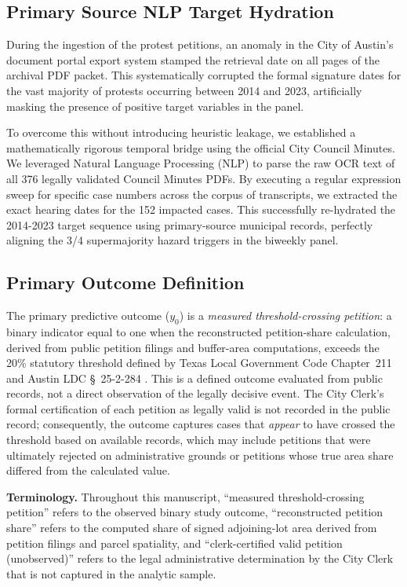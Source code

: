 \documentclass[11pt, letterpaper, oneside]{article}
\begin{document}
\subsection{Primary Source NLP Target Hydration}

During the ingestion of the protest petitions, an anomaly in the City of Austin's document portal export system stamped the retrieval date on all pages of the archival PDF packet. This systematically corrupted the formal signature dates for the vast majority of protests occurring between 2014 and 2023, artificially masking the presence of positive target variables in the panel. 

To overcome this without introducing heuristic leakage, we established a mathematically rigorous temporal bridge using the official City Council Minutes. We leveraged Natural Language Processing (NLP) to parse the raw OCR text of all 376 legally validated Council Minutes PDFs. By executing a regular expression sweep for specific case numbers across the corpus of transcripts, we extracted the exact hearing dates for the 152 impacted cases. This successfully re-hydrated the 2014-2023 target sequence using primary-source municipal records, perfectly aligning the 3/4 supermajority hazard triggers in the biweekly panel.

\subsection{Primary Outcome Definition}
\label{sec:outcome}

The primary predictive outcome ($y_0$) is a \emph{measured threshold-crossing petition}: a binary indicator equal to one when the reconstructed petition-share calculation, derived from public petition filings and buffer-area computations, exceeds the 20\% statutory threshold defined by Texas Local Government Code Chapter~211 and Austin LDC \S~25-2-284 \cite{texas211006}. This is a defined outcome evaluated from public records, not a direct observation of the legally decisive event. The City Clerk's formal certification of each petition as legally valid is not recorded in the public record; consequently, the outcome captures cases that \emph{appear} to have crossed the threshold based on available records, which may include petitions that were ultimately rejected on administrative grounds or petitions whose true area share differed from the calculated value.

\textbf{Terminology.} Throughout this manuscript, ``measured threshold-crossing petition'' refers to the observed binary study outcome, ``reconstructed petition share'' refers to the computed share of signed adjoining-lot area derived from petition filings and parcel spatiality, and ``clerk-certified valid petition (unobserved)'' refers to the legal administrative determination by the City Clerk that is not captured in the analytic sample.
\end{document}
